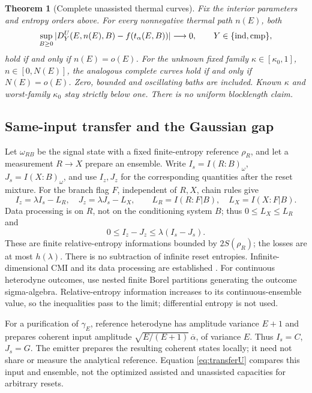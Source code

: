 \documentclass[11pt]{article}
\newtheorem{theorem}{Theorem}
\newcommand{\cmp}{\mathrm{cmp}}
\begin{document}
\begin{theorem}[Complete unassisted thermal curves]
\label{thm:unassisted}
Fix the interior parameters and entropy orders above.
For every nonnegative thermal path \(n(E)\), both
\[
 \sup_{B\ge0}|D^U_Y(E,n(E),B)-f(t_\alpha(E,B))|\longrightarrow0,
 \qquad Y\in\{{\rm ind},\cmp\},
\]
hold if and only if \(n(E)=o(E)\).
For the unknown fixed family
\(\kappa\in[\kappa_0,1]\), \(n\in[0,N(E)]\), the analogous complete
curves hold if and only if \(N(E)=o(E)\).
Zero, bounded and oscillating baths are included. Known \(\kappa\)
and worst-family \(\kappa_0\) stay strictly below one.
There is no uniform blocklength claim.
\end{theorem}

\subsection{Same-input transfer and the Gaussian gap}
Let \(\omega_{RB}\) be the signal state with a fixed finite-entropy
reference \(\rho_R\), and let a measurement \(R\to X\) prepare an
ensemble. Write \(I_s=I(R:B)_\omega\), \(J_s=I(X:B)_\omega\), and use
\(I_z,J_z\) for the corresponding quantities after the reset mixture.
For the branch flag \(F\), independent of \(R,X\), chain rules give
\[
 I_z=\lambda I_s-L_R,\quad J_z=\lambda J_s-L_X,\qquad
 L_R=I(R:F|B),\quad L_X=I(X:F|B).
\]
Data processing is on \(R\), not on the conditioning system \(B\);
thus \(0\le L_X\le L_R\) and
\begin{equation}
 0\le I_z-J_z\le\lambda(I_s-J_s).          \tag{U1}\label{eq:transferU}
\end{equation}
These are finite relative-entropy informations bounded by
\(2S(\rho_R)\); the losses are at most \(h(\lambda)\).
There is no subtraction of infinite reset entropies.
Infinite-dimensional CMI and its data processing are established
\cite[Section6.1, Theorem2]{cmiinf}. For continuous heterodyne outcomes,
use nested finite Borel partitions generating the outcome sigma-algebra.
Relative-entropy information increases to its continuous-ensemble value,
so the inequalities pass to the limit; differential entropy is not used.

For a purification of \(\gamma_E\), reference heterodyne has amplitude
variance \(E+1\) and prepares coherent input amplitude
\(\sqrt{E/(E+1)}\,\overline{\alpha}\), of variance \(E\).
Thus \(I_s=C\), \(J_s=G\). The emitter prepares the resulting coherent
states locally; it need not share or measure the analytical reference.
Equation \eqref{eq:transferU} compares this input and ensemble, not the
optimized assisted and unassisted capacities for arbitrary resets.
\end{document}
